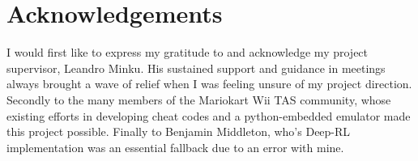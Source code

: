 \chapter*{Acknowledgements}
I would first like to express my gratitude to and acknowledge my project supervisor, Leandro Minku. His sustained support and guidance in meetings always brought a wave of relief when I was feeling unsure of my project direction.
Secondly to the many members of the Mariokart Wii TAS community, whose existing efforts in developing cheat codes and a python-embedded emulator made this project possible.
Finally to Benjamin Middleton, who's Deep-RL implementation was an essential fallback due to an error with mine.